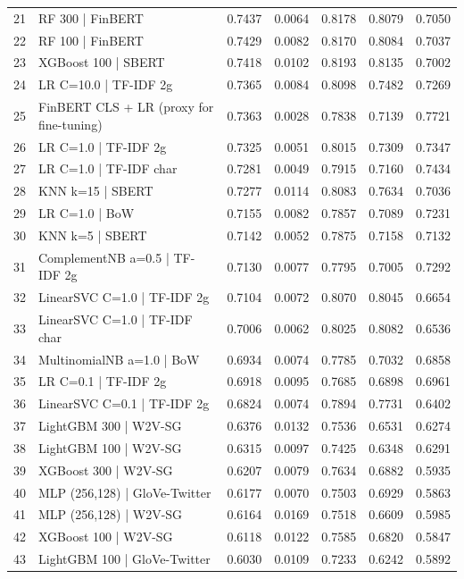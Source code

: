 \begin{table}
\begin{tabular}{llrrrrr}
21 & RF 300 | FinBERT & 0.7437 & 0.0064 & 0.8178 & 0.8079 & 0.7050 \\
22 & RF 100 | FinBERT & 0.7429 & 0.0082 & 0.8170 & 0.8084 & 0.7037 \\
23 & XGBoost 100 | SBERT & 0.7418 & 0.0102 & 0.8193 & 0.8135 & 0.7002 \\
24 & LR C=10.0 | TF-IDF 2g & 0.7365 & 0.0084 & 0.8098 & 0.7482 & 0.7269 \\
25 & FinBERT CLS + LR (proxy for fine-tuning) & 0.7363 & 0.0028 & 0.7838 & 0.7139 & 0.7721 \\
26 & LR C=1.0 | TF-IDF 2g & 0.7325 & 0.0051 & 0.8015 & 0.7309 & 0.7347 \\
27 & LR C=1.0 | TF-IDF char & 0.7281 & 0.0049 & 0.7915 & 0.7160 & 0.7434 \\
28 & KNN k=15 | SBERT & 0.7277 & 0.0114 & 0.8083 & 0.7634 & 0.7036 \\
29 & LR C=1.0 | BoW & 0.7155 & 0.0082 & 0.7857 & 0.7089 & 0.7231 \\
30 & KNN k=5 | SBERT & 0.7142 & 0.0052 & 0.7875 & 0.7158 & 0.7132 \\
31 & ComplementNB a=0.5 | TF-IDF 2g & 0.7130 & 0.0077 & 0.7795 & 0.7005 & 0.7292 \\
32 & LinearSVC C=1.0 | TF-IDF 2g & 0.7104 & 0.0072 & 0.8070 & 0.8045 & 0.6654 \\
33 & LinearSVC C=1.0 | TF-IDF char & 0.7006 & 0.0062 & 0.8025 & 0.8082 & 0.6536 \\
34 & MultinomialNB a=1.0 | BoW & 0.6934 & 0.0074 & 0.7785 & 0.7032 & 0.6858 \\
35 & LR C=0.1 | TF-IDF 2g & 0.6918 & 0.0095 & 0.7685 & 0.6898 & 0.6961 \\
36 & LinearSVC C=0.1 | TF-IDF 2g & 0.6824 & 0.0074 & 0.7894 & 0.7731 & 0.6402 \\
37 & LightGBM 300 | W2V-SG & 0.6376 & 0.0132 & 0.7536 & 0.6531 & 0.6274 \\
38 & LightGBM 100 | W2V-SG & 0.6315 & 0.0097 & 0.7425 & 0.6348 & 0.6291 \\
39 & XGBoost 300 | W2V-SG & 0.6207 & 0.0079 & 0.7634 & 0.6882 & 0.5935 \\
40 & MLP (256,128) | GloVe-Twitter & 0.6177 & 0.0070 & 0.7503 & 0.6929 & 0.5863 \\
41 & MLP (256,128) | W2V-SG & 0.6164 & 0.0169 & 0.7518 & 0.6609 & 0.5985 \\
42 & XGBoost 100 | W2V-SG & 0.6118 & 0.0122 & 0.7585 & 0.6820 & 0.5847 \\
43 & LightGBM 100 | GloVe-Twitter & 0.6030 & 0.0109 & 0.7233 & 0.6242 & 0.5892 \\

\end{tabular}
\end{table}

